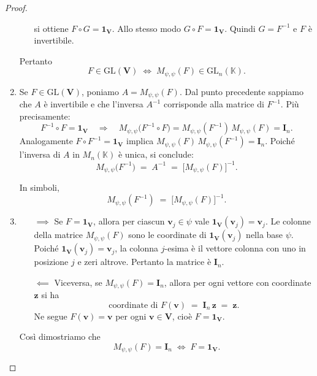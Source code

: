 \documentclass{article}
\theoremstyle{plain}
\theoremstyle{definition}
\theoremstyle{remark}
\begin{document}
\begin{proof}
\begin{enumerate}
\begin{itemize}
\[            \]
            si ottiene \(F\circ G = \mathbf{1_V}\). Allo stesso modo \(G\circ F = \mathbf{1_V}\). Quindi \(G = F^{-1}\) e \(F\) è invertibile.  
    \end{itemize}
    Pertanto 
            \[
              F\in \mathrm{GL}(\mathbf{V})
              \;\Longleftrightarrow\;
              M_{\psi,\psi}(F)\in \mathrm{GL}_n(\mathbb{K}).
            \]
    \item Se \(F\in \mathrm{GL}(\mathbf{V})\), poniamo \(A = M_{\psi,\psi}(F)\). Dal punto precedente sappiamo che \(A\) è invertibile e che l'inversa \(A^{-1}\) corrisponde alla matrice di \(F^{-1}\). Più precisamente:
        \[
          F^{-1}\circ F = \mathbf{1_V}
          \quad\Longrightarrow\quad
          M_{\psi,\psi}\bigl(F^{-1}\circ F\bigr) 
          = 
          M_{\psi,\psi}(F^{-1})\,M_{\psi,\psi}(F) 
          = 
          \mathbf{I}_n.
        \]
        Analogamente 
        \(
          F\circ F^{-1} = \mathbf{1_V}
        \)
        implica
        \(
          M_{\psi,\psi}(F)\,M_{\psi,\psi}(F^{-1}) = \mathbf{I}_n
        \). 
        Poiché l'inversa di \(A\) in \(M_n(\mathbb{K})\) è unica, si conclude:
        \[
          M_{\psi,\psi}\bigl(F^{-1}\bigr)
          \;=\;
          A^{-1}
          \;=\;
          \bigl[M_{\psi,\psi}(F)\bigr]^{-1}.
        \]

        In simboli,
        \[
          M_{\psi,\psi}(F^{-1})
          \;=\;
          \bigl[M_{\psi,\psi}(F)\bigr]^{-1}.
        \]
    \item 
    \begin{itemize}
        \item[$\implies$] 
            Se \(F = \mathbf{1_V}\), allora per ciascun \(\mathbf{v}_j\in\psi\) vale 
            \(\mathbf{1_V}(\mathbf{v}_j) = \mathbf{v}_j\). Le colonne della matrice \(M_{\psi,\psi}(F)\) sono le coordinate di \(\mathbf{1_V}(\mathbf{v}_j)\) nella base \(\psi\). Poiché \(\mathbf{1_V}(\mathbf{v}_j) = \mathbf{v}_j\), la colonna \(j\)-esima è il vettore colonna con uno in posizione \(j\) e zeri altrove. Pertanto la matrice è \(\mathbf{I}_n\).  
        \item[$\impliedby$] 
            Viceversa, se \(M_{\psi,\psi}(F) = \mathbf{I}_n\), allora per ogni vettore con coordinate \(\mathbf{z}\) si ha
            \[
              \text{coordinate di }F(\mathbf{v}) 
              \;=\; 
              \mathbf{I}_n\,\mathbf{z} 
              \;=\; 
              \mathbf{z}.
            \]
            Ne segue \(F(\mathbf{v}) = \mathbf{v}\) per ogni \(\mathbf{v}\in \mathbf{V}\), cioè \(F = \mathbf{1_V}\).
    \end{itemize}
    Così dimostriamo che
    \[
      M_{\psi,\psi}(F) = \mathbf{I}_n 
      \;\Longleftrightarrow\;
      F = \mathbf{1_V}.
    \]
\end{enumerate}    
\end{proof}
\end{document}
